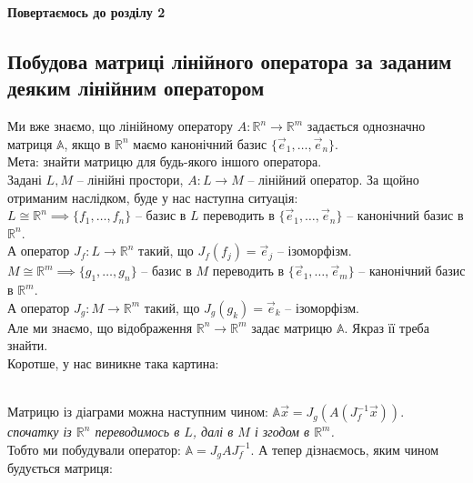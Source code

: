 \documentclass[a4paper, 10pt]{article}
\theoremstyle{theoremdd}
\begin{document}
\begin{center}
\textbf{Повертаємось до розділу 2}
\end{center}
\newpage
{}
\setcounter{section}{2}
\setcounter{subsection}{6}
\subsection{Побудова матриці лінійного оператора за заданим деяким лінійним оператором}
	Ми вже знаємо, що лінійному оператору $A \colon \mathbb{R}^n \to \mathbb{R}^m$ задається однозначно матриця $\mathbb{A}$, якщо в $\mathbb{R}^n$ маємо канонічний базис $\{\vec{e}_1,\dots,\vec{e}_n \}$.\\
	Мета: знайти матрицю для будь-якого іншого оператора.
	\bigskip \\
	Задані $L,M$ -- лінійні простори, $A \colon L \to M$ -- лінійний оператор. За щойно отриманим наслідком, буде у нас наступна ситуація:\\
	$L \cong \mathbb{R}^n \implies \{f_1,\dots,f_n\}$ -- базис в $L$ переводить в $\{\vec{e}_1,\dots,\vec{e}_n\}$ -- канонічний базис в $\mathbb{R}^n$. \\ 
	А оператор $J_f \colon L \to \mathbb{R}^n$ такий, що $J_f(f_j) = \vec{e}_j$ -- ізоморфізм.
	\bigskip \\
	$M \cong \mathbb{R}^m \implies \{g_1,\dots,g_n\}$ -- базис в $M$ переводить в $\{\vec{e}_1,\dots,\vec{e}_m\}$ -- канонічний базис в $\mathbb{R}^m$. \\
	А оператор $J_g \colon M \to \mathbb{R}^m$ такий, що $J_g(g_k) = \vec{e}_k$ -- ізоморфізм.\\
	Але ми знаємо, що відображення $\mathbb{R}^n \to \mathbb{R}^m$ задає матрицю $\mathbb{A}$. Якраз її треба знайти.
	\\
	Коротше, у нас виникне така картина:\\
	\\
	Матрицю із діаграми можна наступним чином: $\mathbb{A}\vec{x} = J_g(A(J^{-1}_f\vec{x}))$.\\
	\textit{спочатку із $\mathbb{R}^n$ переводимось в $L$, далі в $M$ і згодом в $\mathbb{R}^m$.}\\
	Тобто ми побудували оператор: $\mathbb{A} = J_g A J_f^{-1}$. А тепер дізнаємось, яким чином будується матриця:\\
\end{document}

